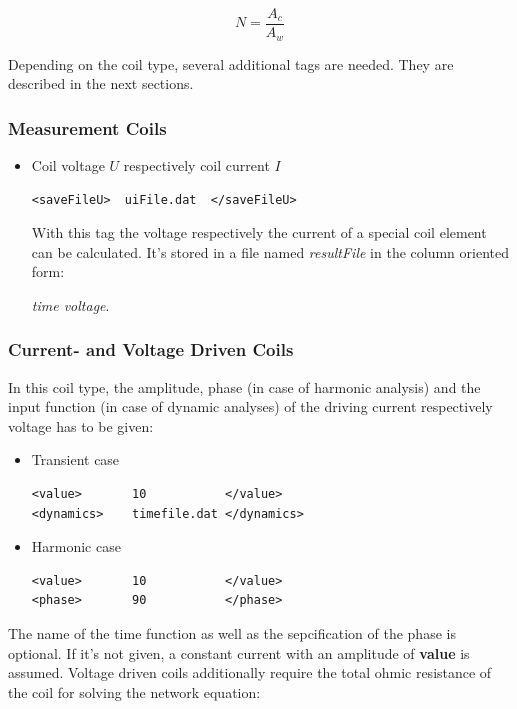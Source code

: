 \begin{equation}
  \label{eq:N}
  N=\frac{A_c}{A_w}
\end{equation}

\noindent
Depending on the coil type, several additional tags are needed. They
are described in the next sections.


\subsubsection{Measurement Coils}

\begin{itemize}
\item Coil voltage $U$ respectively coil current $I$

\begin{verbatim}
<saveFileU>  uiFile.dat  </saveFileU>
\end{verbatim}

  With this tag the voltage respectively the current of a
  special coil element can be calculated. It's stored in a file
  named {\em resultFile} in the column oriented form:

  {\em time voltage}.

\end{itemize}

\subsubsection{Current- and Voltage Driven Coils}
In this coil type, the amplitude, phase (in case of harmonic analysis)
and the input function (in case of dynamic analyses) of the driving
current respectively voltage has to be given:

\begin{itemize}
\item Transient case
\begin{verbatim}
<value>       10           </value>
<dynamics>    timefile.dat </dynamics>
\end{verbatim}

\item Harmonic case
\begin{verbatim}
<value>       10           </value>
<phase>       90           </phase>
\end{verbatim}
\end{itemize}

\noindent
The name of the time function as well as the sepcification of the
phase is optional. If it's not given, a constant current with an
amplitude of {\bf value} is assumed.  
Voltage driven coils additionally require the total ohmic resistance
of the coil for solving the network equation:

